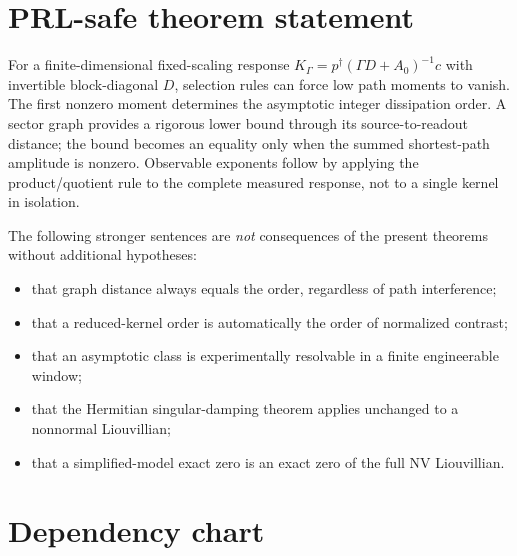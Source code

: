 \documentclass[11pt,a4paper]{article}
\theoremstyle{remark}
\begin{document}
\section{PRL-safe theorem statement}

\begin{claimbox}
For a finite-dimensional fixed-scaling response
$K_\Gamma=p^\dagger(\Gamma D+A_0)^{-1}c$ with invertible block-diagonal $D$,
selection rules can force low path moments to vanish.  The first nonzero
moment determines the asymptotic integer dissipation order.  A sector graph
provides a rigorous lower bound through its source-to-readout distance; the
bound becomes an equality only when the summed shortest-path amplitude is
nonzero.  Observable exponents follow by applying the product/quotient rule to
the complete measured response, not to a single kernel in isolation.
\end{claimbox}

The following stronger sentences are \emph{not} consequences of the present
theorems without additional hypotheses:
\begin{itemize}
\item that graph distance always equals the order, regardless of path
      interference;
\item that a reduced-kernel order is automatically the order of normalized
      contrast;
\item that an asymptotic class is experimentally resolvable in a finite
      engineerable window;
\item that the Hermitian singular-damping theorem applies unchanged to a
      nonnormal Liouvillian;
\item that a simplified-model exact zero is an exact zero of the full NV
      Liouvillian.
\end{itemize}

\section*{Dependency chart}
\end{document}
